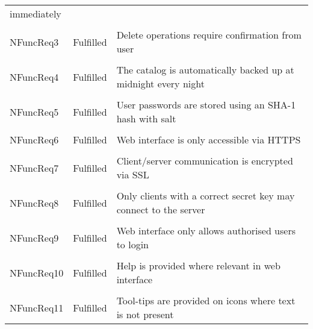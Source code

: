\begin{longtable}{ l l p{5cm} }
                                                      immediately
    \\ \\
    NFuncReq3           & Fulfilled                 & Delete operations require
                                                      confirmation from user
    \\ \\
    NFuncReq4           & Fulfilled                 & The catalog is
                                                      automatically backed up
                                                      at midnight every night
    \\ \\
    NFuncReq5           & Fulfilled                 & User passwords are stored
                                                      using an SHA-1 hash with
                                                      salt
    \\ \\
    NFuncReq6           & Fulfilled                 & Web interface is only
                                                      accessible via HTTPS
    \\ \\
    NFuncReq7           & Fulfilled                 & Client/server
                                                      communication is
                                                      encrypted via SSL
    \\ \\
    NFuncReq8           & Fulfilled                 & Only clients with
                                                      a correct secret key may
                                                      connect to the server
    \\ \\
    NFuncReq9           & Fulfilled                 & Web interface only allows
                                                      authorised users to login
    \\ \\
    NFuncReq10          & Fulfilled                 & Help is provided where
                                                      relevant in web interface
    \\ \\
    NFuncReq11          & Fulfilled                 & Tool-tips are provided on
                                                      icons where text is not
                                                      present

\end{longtable}
